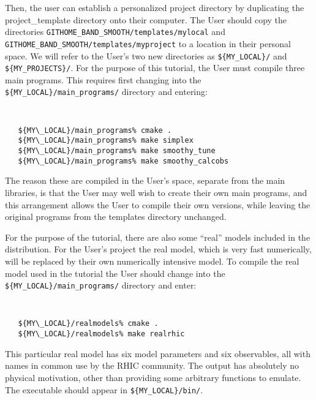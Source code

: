 \documentclass[UserManual.tex]{subfiles}
\begin{document}
Then, the user can establish a personalized project directory by duplicating the project\_template directory onto their computer. The User should copy the directories {\tt GITHOME\_BAND\_SMOOTH/templates/mylocal} and {\tt GITHOME\_BAND\_SMOOTH/templates/myproject} to a location in their personal space. We will refer to the User's two new directories as {\tt \$\{MY\_LOCAL\}/} and {\tt \$\{MY\_PROJECTS\}/}. For the purpose of this tutorial, the User must compile three main programs. This requires first changing into the {\tt \$\{MY\_LOCAL\}/main\_programs/} directory and entering:\\
{\tt
\begin{verbatim}
   ${MY\_LOCAL}/main_programs% cmake .
   ${MY\_LOCAL}/main_programs% make simplex
   ${MY\_LOCAL}/main_programs% make smoothy_tune
   ${MY\_LOCAL}/main_programs% make smoothy_calcobs
\end{verbatim}
}
The reason these are compiled in the User's space, separate from the main libraries, is that the User may well wish to create their own main programs, and this arrangement allows the User to compile their own versions, while leaving the original programs from the templates directory unchanged. 

For the purpose of the tutorial, there are also some ``real'' models included in the distribution. For the User's project the real model, which is very fast numerically, will be replaced by their own numerically intensive model. To compile the real model used in the tutorial the User should change into the {\tt \$\{MY\_LOCAL\}/main\_programs/} directory and enter:
{\tt
\begin{verbatim}
   ${MY\_LOCAL}/realmodels% cmake .
   ${MY\_LOCAL}/realmodels% make realrhic
\end{verbatim}
}
This particular real model has six model parameters and six observables, all with names in common use by the RHIC community. The output has absolutely no physical motivation, other than providing some arbitrary functions to emulate. The executable should appear in {\tt \$\{MY\_LOCAL\}/bin/}.
\end{document}
